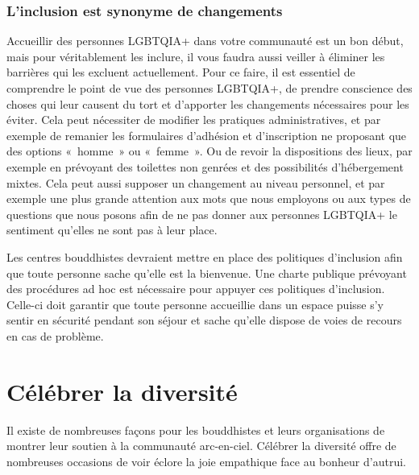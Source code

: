 \documentclass[12pt,openany]{book}
\begin{document}
\subsubsection*{L’inclusion est synonyme de changements}

\noindent Accueillir des personnes \mbox{LGBTQIA+} dans votre communauté est un bon début, mais pour véritablement les inclure, il vous faudra aussi veiller à éliminer les barrières qui les excluent actuellement. Pour ce faire, il est essentiel de comprendre le point de vue des personnes \mbox{LGBTQIA+}, de prendre conscience des choses qui leur causent du tort et d’apporter les changements nécessaires pour les éviter. Cela peut nécessiter de modifier les pratiques administratives, et par exemple de remanier les formulaires d’adhésion et d’inscription ne proposant que des options \mbox{« homme »} ou \mbox{« femme »}. Ou de revoir la dispositions des lieux, par exemple en prévoyant des toilettes non genrées et des possibilités d’hébergement mixtes. Cela peut aussi supposer un changement au niveau personnel, et par exemple une plus grande attention aux mots que nous employons ou aux types de questions que nous posons afin de ne pas donner aux personnes \mbox{LGBTQIA+} le sentiment qu’elles ne sont pas à leur place.

Les centres bouddhistes devraient mettre en place des politiques d’inclusion afin que toute personne sache qu’elle est la bienvenue. Une charte publique prévoyant des procédures ad hoc est nécessaire pour appuyer ces politiques d’inclusion. Celle-ci doit garantir que toute personne accueillie dans un espace puisse s’y sentir en sécurité pendant son séjour et sache qu’elle dispose de voies de recours en cas de problème.

\section*{Célébrer la diversité} 

\noindent Il existe de nombreuses façons pour les bouddhistes et leurs organisations de montrer leur soutien à la communauté arc-en-ciel. Célébrer la diversité offre de nombreuses occasions de voir éclore la joie empathique face au bonheur d’autrui.
\end{document}
